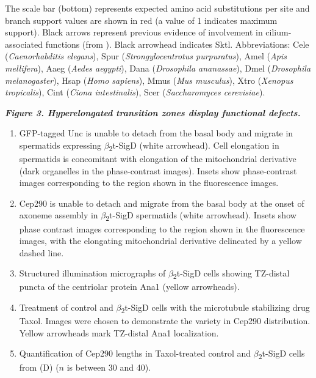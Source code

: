 \documentclass[12pt, twoside, letterpaper]{article}
\newcommand{\sigd}{$\beta$\textsubscript{2}t-SigD}
\begin{document}
\begin{doublespacing}
\begin{linenumbers}
\begin{enumerate}[label={(\Alph*)}, nolistsep]
      The scale bar (bottom) represents expected amino acid substitutions per site and branch support values are shown in red (a value of 1 indicates maximum support).
      Black arrows represent previous evidence of involvement in cilium-associated functions (from \citep{xu2016phosphatidylinositol}).
      Black arrowhead indicates Sktl.
      Abbreviations: Cele (\textit{Caenorhabditis elegans}), Spur (\textit{Strongylocentrotus purpuratus}), Amel (\textit{Apis mellifera}), Aaeg (\textit{Aedes aegypti}), Dana (\textit{Drosophila ananassae}), Dmel (\textit{Drosophila melanogaster}), Hsap (\textit{Homo sapiens}), Mmus (\textit{Mus musculus}), Xtro (\textit{Xenopus tropicalis}), Cint (\textit{Ciona intestinalis}), Scer (\textit{Saccharomyces cerevisiae}).
    \end{enumerate}
    \bigskip
    \textbf{\itshape Figure 3. Hyperelongated transition zones display functional defects.}
    \begin{enumerate}[label={(\Alph*)}, nolistsep]
    \item GFP-tagged Unc is unable to detach from the basal body and migrate in spermatids expressing \sigd{} (white arrowhead).
      Cell elongation in spermatids is concomitant with elongation of the mitochondrial derivative (dark organelles in the phase-contrast images).
      Insets show phase-contrast images corresponding to the region shown in the fluorescence images.
    \item Cep290 is unable to detach and migrate from the basal body at the onset of axoneme assembly in \sigd{} spermatids (white arrowhead).
      Insets show phase contrast images corresponding to the region shown in the fluorescence images, with the
      elongating mitochondrial derivative delineated by a yellow dashed line.
    \item Structured illumination micrographs of \sigd{} cells showing TZ-distal puncta of the centriolar protein Ana1 (yellow arrowheads).
    \item Treatment of control and \sigd{} cells with the microtubule stabilizing drug Taxol.
      Images were chosen to demonstrate the variety in Cep290 distribution.
      Yellow arrowheads mark TZ-distal Ana1 localization.
    \item Quantification of Cep290 lengths in Taxol-treated control and \sigd{} cells from (D) ($n$ is between 30 and 40).
    \end{enumerate}

\end{linenumbers}
\end{doublespacing}
\end{document}
